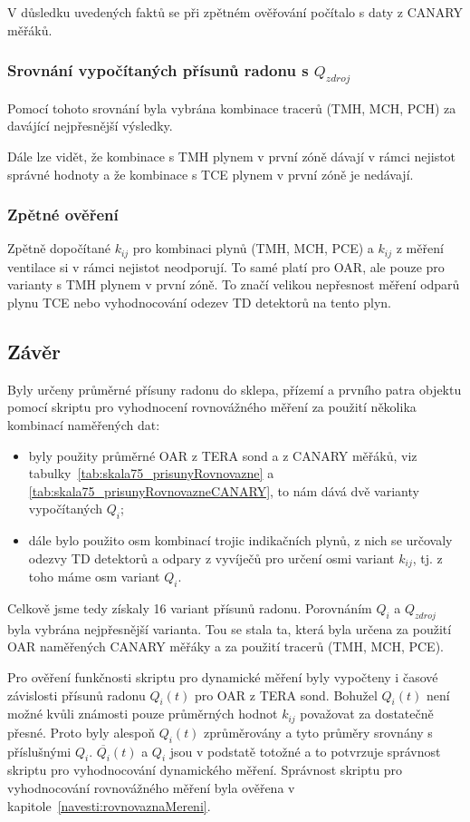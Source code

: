 V důsledku uvedených faktů se při zpětném ověřování počítalo s daty z CANARY měřáků.

\subsubsection{Srovnání vypočítaných přísunů radonu s $Q_{zdroj}$}
Pomocí tohoto srovnání byla vybrána kombinace tracerů (TMH, MCH, PCH) za davájící nejpřesnější výsledky. 

Dále lze vidět, že kombinace s TMH plynem v první zóně dávají v rámci nejistot správné hodnoty a že kombinace s TCE plynem v první zóně je nedávají.

\subsubsection{Zpětné ověření}
Zpětně dopočítané $k_{ij}$ pro kombinaci plynů (TMH, MCH, PCE) a $k_{ij}$ z měření ventilace si v rámci nejistot neodporují. To samé platí pro OAR, ale pouze pro varianty s TMH plynem v první zóně. To značí velikou nepřesnost měření odparů plynu TCE nebo vyhodnocování odezev TD detektorů na tento plyn.

\subsection{Závěr}
Byly určeny průměrné přísuny radonu do sklepa, přízemí a prvního patra objektu pomocí skriptu pro vyhodnocení rovnovážného měření za použití několika kombinací naměřených dat:
\begin{itemize}
    \item byly použity průměrné OAR z TERA sond a z CANARY měřáků, viz tabulky~\ref{tab:skala75_prisunyRovnovazne} a \ref{tab:skala75_prisunyRovnovazneCANARY}, to nám dává dvě varianty vypočítaných $Q_i$;
    \item dále bylo použito osm kombinací trojic indikačních plynů, z nich se určovaly odezvy TD detektorů a odpary z vyvíječů pro určení osmi variant $k_{ij}$, tj. z toho máme osm variant $Q_i$.
\end{itemize}
Celkově jsme tedy získaly 16 variant přísunů radonu. Porovnáním $Q_i$ a $Q_{zdroj}$ byla vybrána nejpřesnější varianta. Tou se stala ta, která byla určena za použití OAR naměřených CANARY měřáky a za použití tracerů (TMH, MCH, PCE).

Pro ověření funkčnosti skriptu pro dynamické měření byly vypočteny i časové závislosti přísunů radonu $Q_i(t)$ pro OAR z TERA sond. Bohužel $Q_i(t)$ není možné kvůli známosti pouze průměrných hodnot $k_{ij}$ považovat za dostatečně přesné. Proto byly alespoň $Q_i(t)$ zprůměrovány a tyto průměry srovnány s příslušnými $Q_i$. $\overline{Q_i}(t)$ a $Q_i$ jsou v podstatě totožné a to potvrzuje správnost skriptu pro vyhodnocování dynamického měření. Správnost skriptu pro vyhodnocování rovnovážného měření byla ověřena v kapitole~\ref{navesti:rovnovaznaMereni}.

